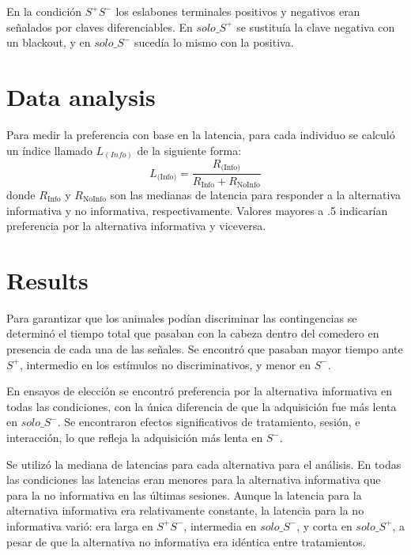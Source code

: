 \documentclass[a4paper,12pt]{article}
\begin{document}
En la condición $S^{+}S^{-}$ los eslabones terminales positivos y negativos eran señalados por claves diferenciables. En $solo\_S^{+}$ se sustituía la clave negativa con un blackout, y en $solo\_S^{-}$ sucedía lo mismo con la positiva.

\section{Data analysis}\label{dataAnalysis}

Para medir la preferencia con base en la latencia, para cada individuo se calculó un índice llamado $L_{(Info)}$ de la siguiente forma:
\[
L_{\mbox{(Info)}} = \frac{
    R_{\mbox{(Info)}}
}{
    R_{\mbox{Info}} + R_{\mbox{NoInfo}}
}
\]
donde $R_{\mbox{Info}}$ y $R_{\mbox{NoInfo}}$ son las medianas de latencia para responder a la alternativa informativa y no informativa, respectivamente. Valores mayores a .5 indicarían preferencia por la alternativa informativa y viceversa.

\section{Results}\label{results}

Para garantizar que los animales podían discriminar las contingencias se determinó el tiempo total que pasaban con la cabeza dentro del comedero en presencia de cada una de las señales. Se encontró que pasaban mayor tiempo ante $S^{+}$, intermedio en los estímulos no discriminativos, y menor en $S^{-}$.

En ensayos de elección se encontró preferencia por la alternativa informativa en todas las condiciones, con la única diferencia de que la adquisición fue más lenta en $solo\_S^{-}$. Se encontraron efectos significativos de tratamiento, sesión, e interacción, lo que refleja la adquisición más lenta en $S^{-}$.

Se utilizó la mediana de latencias para cada alternativa para el análisis. En todas las condiciones las latencias eran menores para la alternativa informativa que para la no informativa en las últimas sesiones. Aunque la latencia para la alternativa informativa era relativamente constante, la latencia para la no informativa varió: era larga en $S^{+}S^{-}$, intermedia en $solo\_S^{-}$, y corta en $solo\_S^{+}$, a pesar de que la alternativa no informativa era idéntica entre tratamientos.
\end{document}
